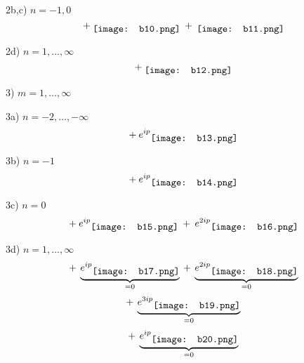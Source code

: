 \begin{center}
\vspace{1em} 

2b,c) $n = -1, 0$
\begin{equation*}
	\: + \: \raisebox{-0.5\height}{\texttt{[image: b10.png]}}
	\: + \: \raisebox{-0.5\height}{\texttt{[image: b11.png]}}
\end{equation*}

\vspace{1em} 

2d) $n = 1, \ldots, \infty$
\begin{equation*}
	\: + \: 
	\raisebox{-0.5\height}{\texttt{[image: b12.png]}}  
\end{equation*}

3) $m = 1, \ldots, \infty$

\vspace{1em} 

3a) $n = -2, \ldots, - \infty$
\begin{equation*}
	\: + \: e^{ip} 
	\raisebox{-0.5\height}{\texttt{[image: b13.png]}} 
\end{equation*}

\vspace{1em} 

3b) $n = -1$
\begin{equation*}
	\: + \: e^{ip}
	\raisebox{-0.5\height}{\texttt{[image: b14.png]}}
\end{equation*}

\vspace{1em} 

3c) $n = 0$
\begin{equation*}
	\: + \: 
	e^{ip}
	\raisebox{-0.5\height}{\texttt{[image: b15.png]}}
	\: + \: 
	e^{2ip}
	\raisebox{-0.5\height}{\texttt{[image: b16.png]}}
\end{equation*}

\vspace{1em} 

3d) $n = 1, \ldots, \infty$
\begin{equation*}
	\: + \: \underbrace{e^{ip}
	\raisebox{-0.5\height}{\texttt{[image: b17.png]}}}_{= 0}
	\: + \: \underbrace{e^{2ip}
	\raisebox{-0.5\height}{\texttt{[image: b18.png]}}}_{= 0}
\end{equation*}
\begin{equation*}
	\: + \: \underbrace{e^{3ip}
	\raisebox{-0.5\height}{\texttt{[image: b19.png]}}}_{= 0}
\end{equation*}
\begin{equation*}
	\: + \: \underbrace{e^{ip}
	\raisebox{-0.5\height}{\texttt{[image: b20.png]}}}_{= 0}
\end{equation*}
\end{center}


